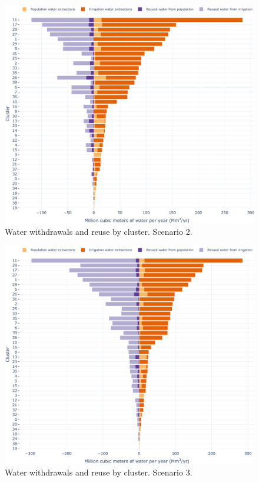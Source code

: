 \documentclass[12pt]{iopart}
\begin{document}
\begin{figure}[!h]
	\centering
	\includegraphics[width=\textwidth]{Scenario2Water}
	\caption{Water withdrawals and reuse by cluster. Scenario 2.}
	\label{fig:Scenario2Water}
\end{figure}

\begin{figure}[!h]
	\centering
	\includegraphics[width=\textwidth]{Scenario3Water}
	\caption{Water withdrawals and reuse by cluster. Scenario 3.}
	\label{fig:Scenario3Water}
\end{figure}
\end{document}
